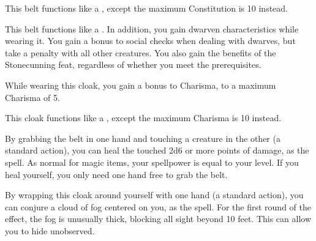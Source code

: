 
 This belt functions like a , except the maximum Constitution is 10 instead.


 This belt functions like a .
In addition, you gain dwarven characteristics while wearing it.
You gain a  bonus to social checks when dealing with dwarves, but take a  penalty with all other creatures.
You also gain the benefits of the Stonecunning feat, regardless of whether you meet the prerequisites.


 While wearing this cloak, you gain a  bonus to Charisma, to a maximum Charisma of 5.


 This cloak functions like a , except the maximum Charisma is 10 instead.


 By grabbing the belt in one hand and touching a creature in the other (a standard action), you can heal the touched 2d6 or more points of damage, as the  spell.
As normal for magic items, your spellpower is equal to your level.
If you heal yourself, you only need one hand free to grab the belt.


 By wrapping this cloak around yourself with one hand (a standard action), you can conjure a cloud of fog centered on you, as the  spell.
For the first round of the effect, the fog is unusually thick, blocking all sight beyond 10 feet.
This can allow you to hide unobserved.

